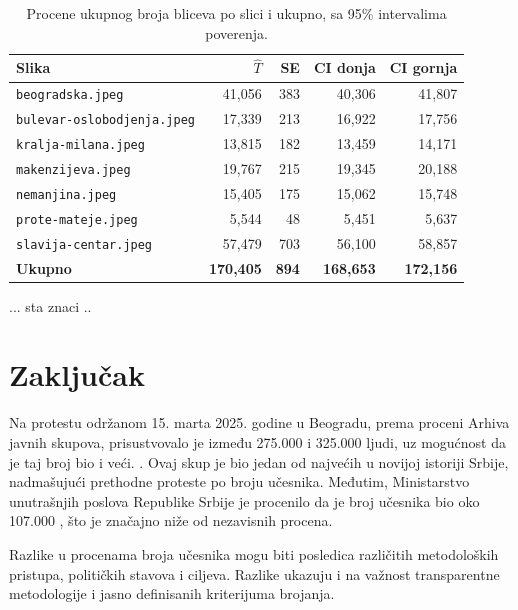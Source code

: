 \documentclass[a4paper,12pt]{article}
\begin{document}
\begin{table}[H]
\centering
\begin{tabular}{lrrrr}
\hline
Slika & $\hat T$ & SE & CI donja & CI gornja \\
\hline
\texttt{beogradska.jpeg}          & 41,056  & 383 & 40,306  & 41,807  \\
\texttt{bulevar-oslobodjenja.jpeg}& 17,339  & 213 & 16,922  & 17,756  \\
\texttt{kralja-milana.jpeg}       & 13,815  & 182 & 13,459  & 14,171  \\
\texttt{makenzijeva.jpeg}         & 19,767  & 215 & 19,345  & 20,188  \\
\texttt{nemanjina.jpeg}           & 15,405  & 175 & 15,062  & 15,748  \\
\texttt{prote-mateje.jpeg}        & 5,544   & 48  & 5,451   & 5,637   \\
\texttt{slavija-centar.jpeg}      & 57,479  & 703 & 56,100  & 58,857  \\
\hline
\textbf{Ukupno}                   & \textbf{170,405} & \textbf{894} & \textbf{168,653} & \textbf{172,156} \\
\hline
\end{tabular}
\caption{Procene ukupnog broja bliceva po slici i ukupno, sa 95\% intervalima poverenja.}
\label{tab:results}
\end{table}

... sta znaci ..

\section{Zaključak}
Na protestu održanom 15. marta 2025. godine u Beogradu, prema proceni Arhiva javnih skupova, prisustvovalo je između 275.000 i 325.000 ljudi, uz mogućnost da je taj broj bio i veći. \cite{n1protest15za15}
. Ovaj skup je bio jedan od najvećih u novijoj istoriji Srbije, nadmašujući prethodne proteste po broju učesnika. Međutim, Ministarstvo unutrašnjih poslova Republike Srbije je procenilo da je broj učesnika bio oko 107.000 \cite{insajder_mup_15za15}, što je značajno niže od nezavisnih procena.

Razlike u procenama broja učesnika mogu biti posledica različitih metodoloških pristupa, političkih stavova i ciljeva. Razlike ukazuju i na važnost transparentne metodologije i jasno definisanih kriterijuma brojanja.
\end{document}
